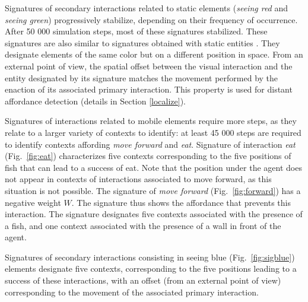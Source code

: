 \documentclass[conference]{IEEEtran}
\makeatletter
\let\cite\relax
\DeclareRobustCommand{\cite}{%
	\let\new@cite@pre\@gobble
	\@ifnextchar[\new@cite{\@citex[]}}
\def\new@cite[#1]{\@ifnextchar[{\new@citea{#1}}{\@citex[#1]}}
\def\new@citea#1{\def\new@cite@pre{#1}\@citex}
\makeatother
\begin{document}
Signatures of secondary interactions related to static elements (\textit{seeing red} and \textit{seeing green}) progressively stabilize, depending on their frequency of occurrence. 
After 50 000 simulation steps, most of these signatures stabilized. 
These signatures are also similar to signatures obtained with static entities \cite{gay:space}\cite{gay:dynamic}. 
They designate elements of the same color but on a different position in space. 
From an external point of view, the spatial offset between the visual interaction and the entity designated by its signature matches the movement performed by the enaction of its associated primary interaction. 
This property is used for distant affordance detection \cite{gay:space} (details in Section \ref{localize}).


Signatures of interactions related to mobile elements require more steps, as they relate to a larger variety of contexts to identify: at least 45 000 steps are required to identify contexts affording \textit{move forward} and \textit{eat}.
Signature of interaction \textit{eat} (Fig.~\ref{fig:eat}) characterizes five contexts corresponding to the five positions of fish that can lead to a success of eat. 
Note that the position under the agent does not appear in contexts of interactions associated to move forward, as this situation is not possible. 
The signature of \textit{move forward} (Fig.~\ref{fig:forward}) has a negative weight $W$. 
The signature thus shows the affordance that prevents this interaction. 
The signature designates five contexts associated with the presence of a fish, and one context associated with the presence of a wall in front of the agent.

Signatures of secondary interactions consisting in seeing blue (Fig.~\ref{fig:sigblue}) elements designate five contexts, corresponding to the five positions leading to a success of these interactions, with an offset (from an external point of view) corresponding to the movement of the associated primary interaction.
\end{document}
